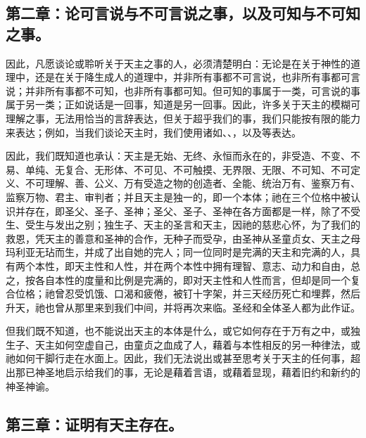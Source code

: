 
\subsection{第二章：论可言说与不可言说之事，以及可知与不可知之事。}

因此，凡愿谈论或聆听关于天主之事的人，必须清楚明白：无论是在关于神性的道理中，还是在关于降生成人的道理中，并非所有事都不可言说，也非所有事都可言说；并非所有事都不可知，也非所有事都可知。但可知的事属于一类，可言说的事属于另一类；正如说话是一回事，知道是另一回事。因此，许多关于天主的模糊可理解之事，无法用恰当的言辞表达，但关于超乎我们的事，我们只能按有限的能力来表达；例如，当我们谈论天主时，我们使用诸如、、，以及等表达。\par

因此，我们既知道也承认：天主是无始、无终、永恒而永在的，非受造、不变、不易、单纯、无复合、无形体、不可见、不可触摸、无界限、无限、不可知、不可定义、不可理解、善、公义、万有受造之物的创造者、全能、统治万有、鉴察万有、监察万物、君主、审判者；并且天主是独一的，即一个本体；祂在三个位格中被认识并存在，即圣父、圣子、圣神；圣父、圣子、圣神在各方面都是一样，除了不受生、受生与发出之别；独生子、天主的圣言和天主，因祂的慈悲心怀，为了我们的救恩，凭天主的善意和圣神的合作，无种子而受孕，由圣神从圣童贞女、天主之母玛利亚无玷而生，并成了出自她的完人；同一位同时是完满的天主和完满的人，具有两个本性，即天主性和人性，并在两个本性中拥有理智、意志、动力和自由，总之，按各自本性的度量和比例是完满的，即对天主性和人性而言，但却是同一个复合位格；祂曾忍受饥饿、口渴和疲倦，被钉十字架，并三天经历死亡和埋葬，然后升天，祂也曾从那里来到我们中间，并将再次来临。圣经和全体圣人都为此作证。\par

但我们既不知道，也不能说出天主的本体是什么，或它如何存在于万有之中，或独生子、天主如何空虚自己，由童贞之血成了人，藉着与本性相反的另一种律法，或祂如何干脚行走在水面上。因此，我们无法说出或甚至思考关于天主的任何事，超出那已神圣地启示给我们的事，无论是藉着言语，或藉着显现，藉着旧约和新约的神圣神谕。\par


\subsection{第三章：证明有天主存在。}

